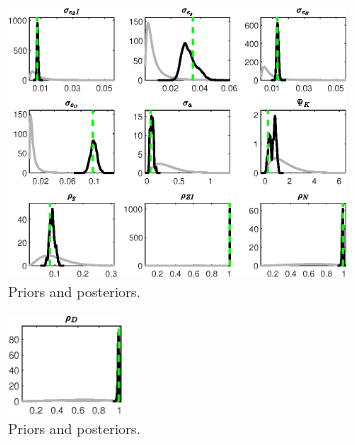  
\begin{figure}[H]
\centering
\includegraphics[width=0.80\textwidth]{BRS_growth_ext_fd_v1/Output/BRS_growth_ext_fd_v1_PriorsAndPosteriors1}
\caption{Priors and posteriors.}\label{Fig:PriorsAndPosteriors:1}
\end{figure}
 
\begin{figure}[H]
\centering
\includegraphics[width=0.27\textwidth]{BRS_growth_ext_fd_v1/Output/BRS_growth_ext_fd_v1_PriorsAndPosteriors2}
\caption{Priors and posteriors.}\label{Fig:PriorsAndPosteriors:2}
\end{figure}
 
